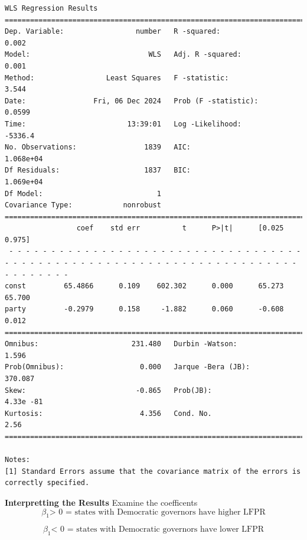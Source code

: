 \begin{verbatim}
WLS Regression Results                            
==============================================================================
Dep. Variable:                 number   R -squared:                       0.002
Model:                            WLS   Adj. R -squared:                  0.001
Method:                 Least Squares   F -statistic:                     3.544
Date:                Fri, 06 Dec 2024   Prob (F -statistic):             0.0599
Time:                        13:39:01   Log -Likelihood:                -5336.4
No. Observations:                1839   AIC:                         1.068e+04
Df Residuals:                    1837   BIC:                         1.069e+04
Df Model:                           1                                         
Covariance Type:            nonrobust                                         
==============================================================================
                 coef    std err          t      P>|t|      [0.025      0.975]
 - - - - - - - - - - - - - - - - - - - - - - - - - - - - - - - - - - - - - - - - - - - - - - - - - - - - - - - - - - - - - - - - - - - - - - - - - - - - - -
const         65.4866      0.109    602.302      0.000      65.273      65.700
party         -0.2979      0.158     -1.882      0.060      -0.608       0.012
==============================================================================
Omnibus:                      231.480   Durbin -Watson:                   1.596
Prob(Omnibus):                  0.000   Jarque -Bera (JB):              370.087
Skew:                          -0.865   Prob(JB):                     4.33e -81
Kurtosis:                       4.356   Cond. No.                         2.56
==============================================================================

Notes:
[1] Standard Errors assume that the covariance matrix of the errors is correctly specified.
\end{verbatim}

\textbf{Interpretting the Results}
Examine the coefficents
\begin{equation}

\beta_1 \text{> 0 = states with Democratic governors have higher LFPR}
\end{equation}

\begin{equation}
\beta_1 \text{< 0 = states with Democratic governors have lower LFPR}
\end{equation}

